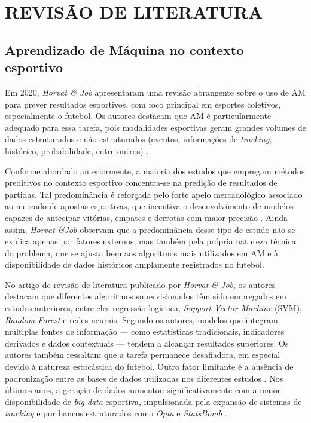 %
\chapter{REVISÃO DE LITERATURA}

\section{Aprendizado de Máquina no contexto esportivo}

Em 2020, \textit{Horvat \& Job} apresentaram uma revisão abrangente sobre o uso de AM para prever resultados esportivos, com foco principal em esportes coletivos, 
especialmente o futebol. Os autores destacam que AM é particularmente adequado para essa tarefa, pois modalidades esportivas geram grandes volumes de dados estruturados 
e não estruturados (eventos, informações de \textit{tracking}, histórico, probabilidade, entre outros) \cite{Horvat2020}.

Conforme abordado anteriormente, a maioria dos estudos que empregam métodos preditivos no contexto esportivo concentra-se na predição de resultados de partidas. 
Tal predominância é reforçada pelo forte apelo mercadológico associado ao mercado de apostas esportivas, que incentiva o desenvolvimento de modelos capazes de 
antecipar vitórias, empates e derrotas com maior precisão \cite{Abidin2021}. Ainda assim, \textit{Horvat \&Job} observam que a predominância desse tipo de estudo 
não se explica apenas por fatores externos, mas também pela própria natureza técnica do problema, que se ajusta bem aos algoritmos mais utilizados em AM e 
à disponibilidade de dados históricos amplamente registrados no futebol.

No artigo de revisão de literatura publicado por \textit{Horvat \& Job}, os autores destacam que diferentes algoritmos supervisionados têm sido empregados em
estudos anteriores, entre eles regressão logística, \textit{Support Vector Machine} (SVM), \textit{Random Forest} e redes neurais. Segundo os autores, 
modelos que integram múltiplas fontes de informação — como estatísticas tradicionais, indicadores derivados e dados contextuais — tendem a alcançar resultados superiores. 
Os autores também ressaltam que a tarefa permanece desafiadora, em especial devido à natureza estocástica do futebol. Outro fator limitante é a ausência de 
padronização entre as bases de dados utilizadas nos diferentes estudos \cite{Horvat2020}. Nos últimos anos, a geração de dados aumentou significativamente 
com a maior disponibilidade de \textit{big data} esportiva, impulsionada pela expansão de sistemas de \textit{tracking} e por bancos estruturados como \textit{Opta} 
e \textit{StatsBomb} \cite{Horvat2020}.

